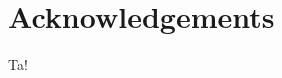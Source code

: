 \documentclass[../main.tex]{subfiles}
\begin{document}
\chapter*{Acknowledgements}
Ta!
\end{document}
